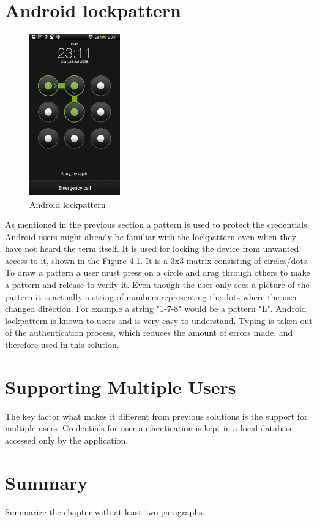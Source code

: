 \section{Android lockpattern}
\begin{figure} 
\begin{center} 
\includegraphics[width=0.35\textwidth]{images/lockpattern.png} \caption{Android lockpattern} \label{fig:android lockpattern} 
\end{center}
\end{figure}
As mentioned in the previous section a pattern is used to protect the credentials. Android users might already be familiar with the lockpattern even when they have not heard the term itself. It is used for locking the device from unwanted access to it, shown in the Figure 4.1. It is a 3x3 matrix consisting of circles/dots. To draw a pattern a user must press on a circle and drag through others to make a pattern and release to verify it. Even though the user only sees a picture of the pattern it is actually a string of numbers representing the dots where the user changed direction. For example a string "1-7-8" would be a pattern "L". 
Android lockpattern is known to users and is very easy to understand. Typing is taken out of the authentication process, which reduces the amount of errors made, and therefore used in this solution.

\section{Supporting Multiple Users}
The key factor what makes it different from previous solutions is the support for multiple users. Credentials for user authentication is kept in a local database accessed only by the application.

\section{Summary}
Summarize the chapter with at least two paragraphs.




